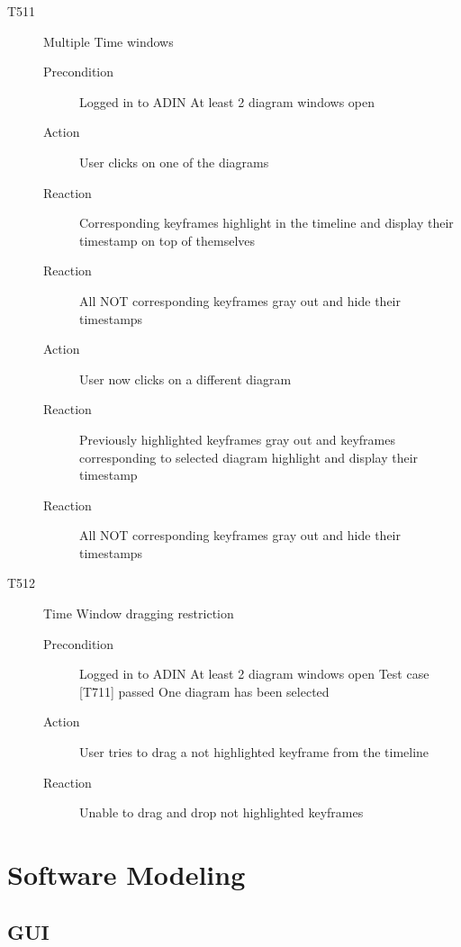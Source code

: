 \documentclass[twoside, english, draft]{Pflichtenheft}
\begin{document}
\begin{description}
  \item[T511] Multiple Time windows
\begin{description}
    \item[Precondition]
	Logged in to ADIN
	At least 2 diagram windows open
    \item[Action]
    User clicks on one of the diagrams
    \item[Reaction]
	Corresponding keyframes highlight in the timeline and display their timestamp on top of themselves
	\item[Reaction]
	All NOT corresponding keyframes gray out and hide their timestamps
	\item[Action]
	User now clicks on a different diagram
    \item[Reaction]
	Previously highlighted keyframes gray out and keyframes corresponding to selected diagram highlight and display their timestamp
	\item[Reaction]
	All NOT corresponding keyframes gray out and hide their timestamps
\end{description}

  \item[T512] Time Window dragging restriction
\begin{description}
    \item[Precondition]
	Logged in to ADIN
	At least 2 diagram windows open
	Test case [T711] passed
	One diagram has been selected
    \item[Action]
    User tries to drag a not highlighted keyframe from the timeline
    \item[Reaction]
	Unable to drag and drop not highlighted keyframes
\end{description}


\end{description}

\section{Software Modeling}



\subsection{GUI}
\end{document}
